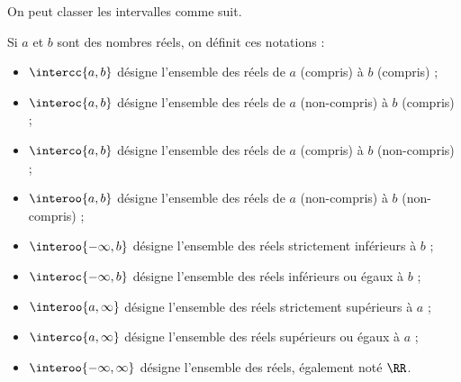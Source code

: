\documentclass[french,xcolor=svgnames]{beamer}
\begin{document}
\begin{frame}
  On peut classer les intervalles comme suit.
  \begin{property}
    Si \(a\) et \(b\) sont des nombres réels, on définit ces notations :\pause{}
    \begin{itemize}
    \item $\intercc{a,b}$\pause{} désigne l'ensemble des réels de $a$ (compris) à $b$ (compris) ;\pause{}
    \item $\interoc{a,b}$\pause{} désigne l'ensemble des réels de $a$ (non-compris) à $b$ (compris) ;\pause{}
    \item $\interco{a,b}$\pause{} désigne l'ensemble des réels de $a$ (compris) à $b$ (non-compris) ;\pause{}
    \item $\interoo{a,b}$\pause{} désigne l'ensemble des réels de $a$ (non-compris) à $b$ (non-compris) ;\pause{}
    \item \(\interoo{-\infty,b}\)\pause{} désigne l'ensemble des réels strictement inférieurs à \(b\) ;\pause{}
    \item \(\interoc{-\infty,b}\)\pause{} désigne l'ensemble des réels inférieurs ou égaux à \(b\) ;\pause{}
    \item \(\interoo{a,\infty}\)\pause{} désigne l'ensemble des réels strictement supérieurs à \(a\) ;\pause{}
    \item \(\interco{a,\infty}\)\pause{} désigne l'ensemble des réels supérieurs ou égaux à \(a\) ;\pause{}
    \item \(\interoo{-\infty,\infty}\)\pause{} désigne l'ensemble des réels, également noté \(\RR\).\pause{}
    \end{itemize}
  \end{property}
\end{frame}
\end{document}
